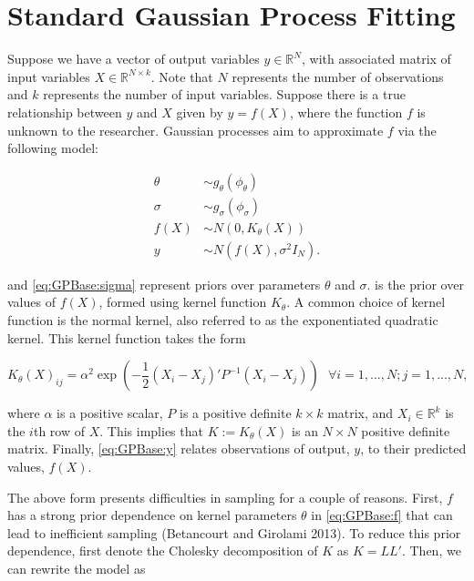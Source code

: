 \documentclass{article}
\newcommand{\RR}{\mathbb{R}}
\begin{document}
	
\section{Standard Gaussian Process Fitting}

Suppose we have a vector of output variables $y\in\RR^N$, with associated matrix of input variables $X\in\RR^{N\times k}$. Note that $N$ represents the number of observations and $k$ represents the number of input variables. Suppose there is a true relationship between $y$ and $X$ given by $y = f(X)$, where the function $f$ is unknown to the researcher. Gaussian processes aim to approximate $f$ via the following model:

\begin{subequations}
\begin{align}
	\label{eq:GPBase:theta} \theta &\sim g_\theta(\phi_\theta)\\ 
	\label{eq:GPBase:sigma} \sigma &\sim g_\sigma(\phi_\sigma)\\ 
	\label{eq:GPBase:f} f(X) &\sim N(0, K_\theta(X))\\ 
	\label{eq:GPBase:y} y &\sim N(f(X), \sigma^2 I_N). 
\end{align}
\end{subequations}

\noindent {} and \cref{eq:GPBase:sigma} represent priors over parameters $\theta$ and $\sigma$.  is the prior over values of $f(X)$, formed using kernel function $K_\theta$. A common choice of kernel function is the normal kernel, also referred to as the exponentiated quadratic kernel. This kernel function takes the form

\begin{equation}
	K_\theta(X)_{ij} = \alpha^2 \exp\left(-\frac12 (X_i - X_j)' P^{-1} (X_i - X_j)\right)\mbox{\ \ \ \ }\forall i=1,...,N; j=1,...,N,
\end{equation}

\noindent where $\alpha$ is a positive scalar, $P$ is a positive definite $k\times k$ matrix, and $X_i\in\RR^k$ is the $i$th row of $X$. This implies that $K := K_\theta(X)$ is an $N\times N$ positive definite matrix. Finally, \cref{eq:GPBase:y} relates observations of output, $y$, to their predicted values, $f(X)$.

The above form presents difficulties in sampling for a couple of reasons. First, $f$ has a strong prior dependence on kernel parameters $\theta$ in \cref{eq:GPBase:f} that can lead to inefficient sampling (Betancourt and Girolami 2013). To reduce this prior dependence, first denote the Cholesky decomposition of $K$ as $K = LL'$. Then, we can rewrite the model as 
\end{document}
